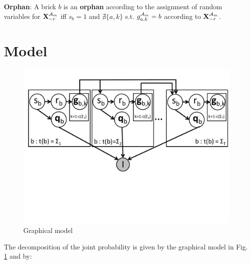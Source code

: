 \documentclass[11pt]{article}
\newcommand{\A}{{\cal A}}
\newcommand{\X}{\mathbf{X}}
\newcommand{\Xrm}{\X^{\Am}_{-r}}
\newcommand{\Am}{\A_{m}}
\newenvironment{definition}[1][Definition]{\begin{trivlist}
\item[\hskip \labelsep {\bfseries #1}]}{\end{trivlist}}
\begin{document}
\begin{definition}
\textbf{Orphan}: A brick $b$ is an \textbf{orphan} according to the assignment of random variables for $\Xrm$ iff $s_b=1$ and $\nexists \{a,k\}$ s.t. $g^{\Am}_{a,k} = b$ according to $\Xrm$.
\end{definition}


\section{Model}

\begin{figure}[htbp]
\begin{center}
\includegraphics[width=\textwidth, trim=0cm 6cm 0cm 0cm]{gm.pdf}
\caption{Graphical model}
\label{gm}
\end{center}
\end{figure}

\FloatBarrier

The decomposition of the joint probability is given by the graphical model in Fig. \ref{gm} and by: \\
\end{document}
